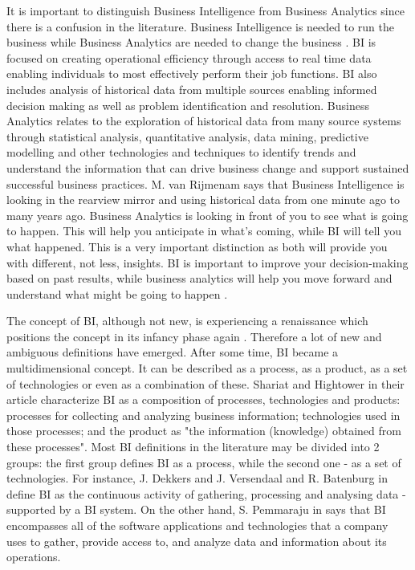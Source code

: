 \documentclass[runningheads]{llncs}
\begin{document}
It is important to distinguish Business Intelligence from Business Analytics since there is a confusion in the literature.  Business Intelligence is needed to run the business while Business Analytics are needed to change the business \cite{HEINZE}. BI is focused on creating operational efficiency through access to real time data enabling individuals to most effectively perform their job functions. BI also includes analysis of historical data from multiple sources enabling informed decision making as well as problem identification and resolution. Business Analytics relates to the exploration of historical data from many source systems through statistical analysis, quantitative analysis, data mining, predictive modelling and other technologies and techniques to identify trends and understand the information that can drive business change and support sustained successful business practices. M. van Rijmenam says that Business Intelligence is looking in the rearview mirror and using historical data from one minute ago to many years ago. Business Analytics is looking in front of you to see what is going to happen. This will help you anticipate in what’s coming, while BI will tell you what happened. This is a very important distinction as both will provide you with different, not less, insights. BI is important to improve your decision-making based on past results, while business analytics will help you move forward and understand what might be going to happen \cite{HEINZE}.

The concept of BI, although not new, is experiencing a renaissance which positions the concept in its infancy phase again \cite{SHOLLO}. Therefore a lot of new and ambiguous definitions have emerged. After some time, BI became a multidimensional concept. It can be described as a process, as a product, as a set of technologies or even as a combination of these. Shariat and Hightower in their article \cite{SHARIAT} characterize BI as a composition of processes, technologies and products: processes for collecting and analyzing business information; technologies used in those processes; and the product as "the information (knowledge) obtained from these processes". Most BI definitions in the literature may be divided into 2 groups: the first group defines BI as a process, while the second one - as a set of technologies. For instance, J. Dekkers and J. Versendaal and R. Batenburg in \cite{DEKKERS} define BI as the continuous activity of gathering, processing and analysing data - supported by a BI system. On the other hand, S. Pemmaraju in \cite{RELATION} says that BI encompasses all of the software applications and technologies that a company uses to gather, provide access to, and analyze data and information about its operations. 
\end{document}
